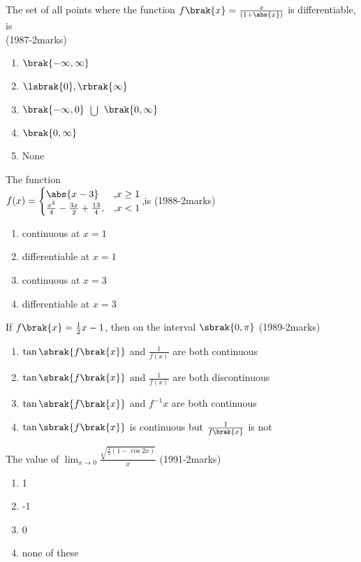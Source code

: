 	\item The set of all points where the function $f\brak{x}=\frac{x}{(1+\abs{x})}$ is differentiable, is \\ \hfill{(1987-2marks)}
		\begin{enumerate}
			\item $\brak{- \infty, \infty}$
			\item $\lsbrak{0}, \rbrak{\infty}$
			\item $\brak{- \infty,0}$ $\bigcup$ $\brak{0, \infty}$
			\item $\brak{0, \infty}$
			\item None 
		\end{enumerate}
	\item The function \\ $f(x)=\begin{cases}\abs{x-3} & \text{,} x \geq 1 \\ \frac{x^2}{4}-\frac{3x}{2}+\frac{13}{4}, & \text{,} x<1 \end{cases}$,is \hfill{(1988-2marks)}
			\begin{enumerate}
				\item continuous at $x=1$
				\item differentiable at $x=1$
				\item continuous at $x=3$
				\item differentiable at $x=3$
			\end{enumerate}
		\item If $f\brak{x} = \frac{1}{2}x-1$, then on the interval $\sbrak{0,\pi}$ \hfill{(1989-2marks)}
			\begin{enumerate}
				\item $\tan{\sbrak{f\brak{x}}}$ and $\frac{1}{f(x)}$ are both continuous
				\item $\tan{\sbrak{f\brak{x}}}$ and $\frac{1}{f(x)}$ are both discontinuous
				\item $\tan{\sbrak{f\brak{x}}}$ and $f^{-1}x$ are both continuous
				\item $\tan{\sbrak{f\brak{x}}}$ is continuous but $\frac{1}{f\brak{x}}$ is not
			\end{enumerate}
		\item The value of $\lim_{x\to0}{\frac{\sqrt{\frac{1}{2}(1-\cos{2x})}}{x}}$ \hfill{(1991-2marks)}
			\begin{enumerate}
				\item 1
				\item -1
				\item 0
				\item none of these 
			\end{enumerate}
